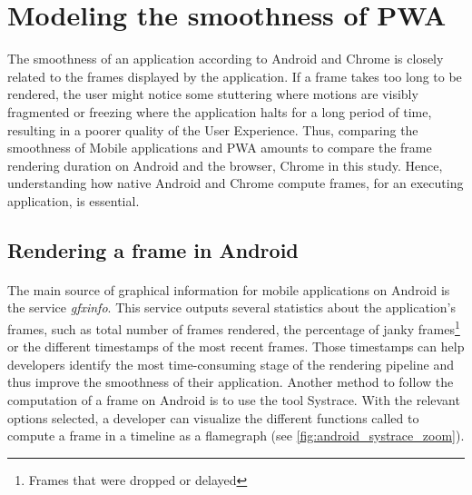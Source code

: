 
\section{Modeling the smoothness of PWA}
\label{method:smoothness}
    
    The smoothness of an application according to Android and Chrome is closely related to the frames displayed by the application\citationneeded. If a frame takes too long to be rendered, the user might notice some stuttering where motions are visibly fragmented or freezing where the application halts for a long period of time, resulting in a poorer quality of the User Experience. Thus, comparing the smoothness of Mobile applications and PWA amounts to compare the frame rendering duration on Android and the browser, Chrome in this study. Hence, understanding how native Android and Chrome compute frames, for an executing application, is essential. 
    
    \subsection{Rendering a frame in Android}
    
    \paragraph{}
    The main source of graphical information for mobile applications on Android is the service \textit{gfxinfo}. This service outputs several statistics about the application's frames, such as total number of frames rendered, the percentage of janky frames\footnote{Frames that were dropped or delayed} or the different timestamps of the most recent frames. Those timestamps can help developers identify the most time-consuming stage of the rendering pipeline and thus improve the smoothness of their application. \newline
    \indent Another method to follow the computation of a frame on Android is to use the tool Systrace. With the relevant options selected, a developer can visualize the different functions called to compute a frame in a timeline as a flamegraph (see \autoref{fig:android_systrace_zoom}).
    
